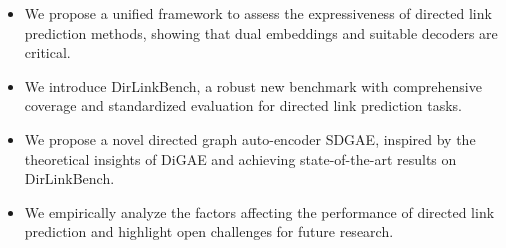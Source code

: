 \begin{itemize}[topsep=0pt, partopsep=0pt, itemsep=0.0pt]
    \item We propose a unified framework to assess the expressiveness of directed link prediction methods, showing that dual embeddings and suitable decoders are critical.
    
    \item We introduce DirLinkBench, a robust new benchmark with comprehensive coverage and standardized evaluation for directed link prediction tasks.
    
    \item We propose a novel directed graph auto-encoder SDGAE, inspired by the theoretical insights of DiGAE and achieving state-of-the-art results on DirLinkBench.
    
    \item We empirically analyze the factors affecting the performance of directed link prediction and highlight open challenges for future research.
\end{itemize}























